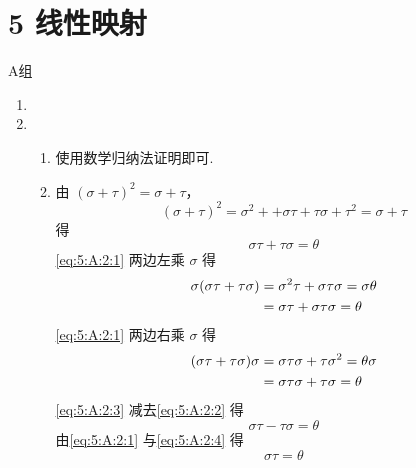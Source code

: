 \section*{5 线性映射}

\vspace{2ex}

\centerline{\heiti A组}
\begin{enumerate}
    \item

    \item \begin{enumerate}
              \item 使用数学归纳法证明即可.

              \item 由 $ (\sigma + \tau)^2 = \sigma + \tau $，
                    \[ (\sigma + \tau)^2 = \sigma^2 + + \sigma \tau + \tau \sigma + \tau^2 = \sigma + \tau \]
                    得
                    \begin{equation} \label{eq:5:A:2:1}
                        \sigma \tau + \tau \sigma = \theta
                    \end{equation}
                    \autoref{eq:5:A:2:1} 两边左乘 $ \sigma $ 得
                    \begin{align}
                        \sigma(\sigma \tau + \tau \sigma) & = \sigma^2 \tau + \sigma \tau \sigma = \sigma \theta \notag    \\
                                                          & = \sigma \tau + \sigma \tau \sigma = \theta \label{eq:5:A:2:2}
                    \end{align}
                    \autoref{eq:5:A:2:1} 两边右乘 $ \sigma $ 得
                    \begin{align}
                        (\sigma \tau + \tau \sigma)\sigma & = \sigma \tau \sigma + \tau \sigma^2 = \theta \sigma \notag    \\
                                                          & = \sigma \tau \sigma + \tau \sigma = \theta \label{eq:5:A:2:3}
                    \end{align}
                    \autoref{eq:5:A:2:3} 减去\autoref{eq:5:A:2:2} 得
                    \begin{equation}
                        \sigma \tau - \tau \sigma = \theta \label{eq:5:A:2:4}
                    \end{equation}
                    由\autoref{eq:5:A:2:1} 与\autoref{eq:5:A:2:4} 得
                    \[ \sigma \tau = \theta \]


\end{enumerate}
\end{enumerate}
